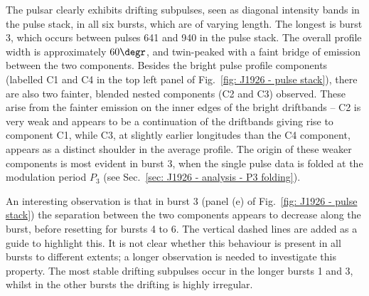 The pulsar clearly exhibits drifting subpulses, seen as diagonal intensity bands in the pulse stack, in all six bursts, which are of varying length. The longest is burst 3, which occurs between pulses 641 and 940 in the pulse stack. The overall profile width is approximately $60\degr$, and twin-peaked with a faint bridge of emission between the two components. Besides the bright pulse profile components (labelled C1 and C4 in the top left panel of Fig.~\ref{fig: J1926 - pulse stack}), there are also two fainter, blended nested components (C2 and C3) observed. These arise from the fainter emission on the inner edges of the bright driftbands -- C2 is very weak and appears to be a continuation of the driftbands giving rise to component C1, while C3, at slightly earlier longitudes than the C4 component, appears as a distinct shoulder in the average profile. The origin of these weaker components is most evident in burst 3, when the single pulse data is folded at the modulation period $P_3$ (see Sec.~\ref{sec: J1926 - analysis - P3 folding}).

An interesting observation is that in burst 3 (panel (e) of Fig.~\ref{fig: J1926 - pulse stack}) the separation between the two components appears to decrease along the burst, before resetting for bursts 4 to 6. The vertical dashed lines are added as a guide to highlight this. It is not clear whether this behaviour is present in all bursts to different extents; a longer observation is needed to investigate this property. The most stable drifting subpulses occur in the longer bursts 1 and 3, whilst in the other bursts the drifting is highly irregular.


